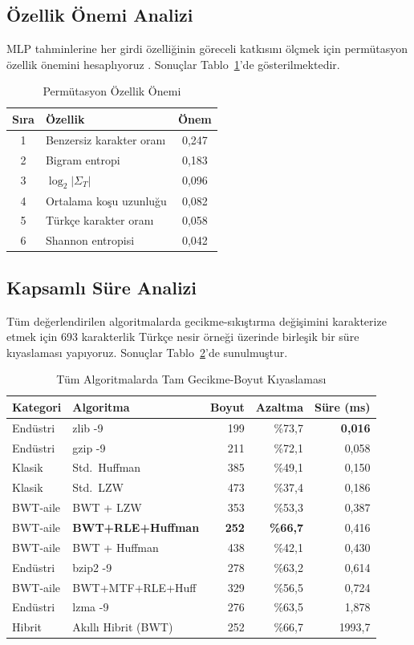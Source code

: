 \documentclass[conference]{IEEEtran}
\begin{document}
\subsection{Özellik Önemi Analizi}

MLP tahminlerine her girdi özelliğinin göreceli katkısını ölçmek için permütasyon özellik önemini hesaplıyoruz \cite{breiman2001}. Sonuçlar Tablo~\ref{tab:importance}'de gösterilmektedir.

\begin{table}[h]
\caption{Permütasyon Özellik Önemi}
\label{tab:importance}
\centering
\begin{tabular}{@{}clc@{}}
\toprule
Sıra & Özellik & Önem \\
\midrule
1 & Benzersiz karakter oranı & 0,247 \\
2 & Bigram entropi & 0,183 \\
3 & \(\log_2 |\Sigma_T|\) & 0,096 \\
4 & Ortalama koşu uzunluğu & 0,082 \\
5 & Türkçe karakter oranı & 0,058 \\
6 & Shannon entropisi & 0,042 \\
\bottomrule
\end{tabular}
\end{table}

\subsection{Kapsamlı Süre Analizi}

Tüm değerlendirilen algoritmalarda gecikme-sıkıştırma değişimini karakterize etmek için 693 karakterlik Türkçe nesir örneği üzerinde birleşik bir süre kıyaslaması yapıyoruz. Sonuçlar Tablo~\ref{tab:timing}'de sunulmuştur.

\begin{table}[h]
\caption{Tüm Algoritmalarda Tam Gecikme-Boyut Kıyaslaması}
\label{tab:timing}
\centering
\small
\begin{tabular}{@{}llrrr@{}}
\toprule
Kategori & Algoritma & Boyut & Azaltma & Süre (ms) \\
\midrule
Endüstri & zlib -9 & 199 & \%73,7 & \textbf{0,016} \\
Endüstri & gzip -9 & 211 & \%72,1 & 0,058 \\
Klasik & Std.\ Huffman & 385 & \%49,1 & 0,150 \\
Klasik & Std.\ LZW & 473 & \%37,4 & 0,186 \\
BWT-aile & BWT + LZW & 353 & \%53,3 & 0,387 \\
BWT-aile & \textbf{BWT+RLE+Huffman} & \textbf{252} & \textbf{\%66,7} & 0,416 \\
BWT-aile & BWT + Huffman & 438 & \%42,1 & 0,430 \\
Endüstri & bzip2 -9 & 278 & \%63,2 & 0,614 \\
BWT-aile & BWT+MTF+RLE+Huff & 329 & \%56,5 & 0,724 \\
Endüstri & lzma -9 & 276 & \%63,5 & 1,878 \\
Hibrit & Akıllı Hibrit (BWT) & 252 & \%66,7 & 1993,7 \\
\bottomrule
\end{tabular}
\end{table}
\end{document}
